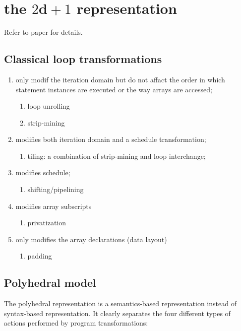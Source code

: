 \section{the $2\mathbf{d}+1$ representation}

Refer to paper \cite{girbal2006semi}\cite{vasilache2007scalable}\cite{bastoul2011openscop} for details.

\subsection {Classical loop transformations}

\begin{enumerate}
  \item only modif the iteration domain but do not affact the order in which
  statement instances are executed or the way arrays are accessed;
  \begin{enumerate}
    \item loop unrolling
    \item strip-mining
  \end{enumerate}
  \item modifies both iteration domain and a schedule transformation;
  \begin{enumerate}
    \item tiling: a combination of strip-mining and loop interchange;
  \end{enumerate}
  \item modifies schedule;
  \begin{enumerate}
    \item shifting/pipelining
  \end{enumerate}
  \item modifies array subscripts
  \begin{enumerate}
    \item privatization
  \end{enumerate}
  \item only modifies the array declarations (data layout)
  \begin{enumerate}
    \item padding
  \end{enumerate}
\end{enumerate}

\subsection{Polyhedral model}

The polyhedral representation is a semantics-based representation instead of
syntax-based representation. It clearly separates the four different types of
actions performed by program transformations:


